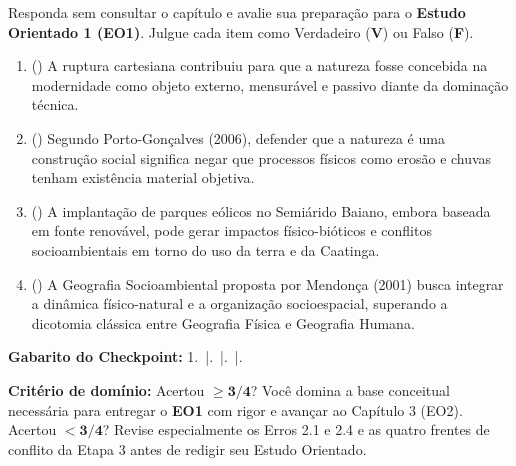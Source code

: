 \begin{boxTeste}
Responda sem consultar o capítulo e avalie sua preparação para o \textbf{Estudo Orientado 1 (EO1)}. Julgue cada item como Verdadeiro (\textbf{V}) ou Falso (\textbf{F}).
\begin{enumerate}[leftmargin=1.8em, itemsep=3pt]
  \item (\quad) A ruptura cartesiana contribuiu para que a natureza fosse concebida na modernidade como objeto externo, mensurável e passivo diante da dominação técnica.
  \item (\quad) Segundo Porto-Gonçalves (2006), defender que a natureza é uma construção social significa negar que processos físicos como erosão e chuvas tenham existência material objetiva.
  \item (\quad) A implantação de parques eólicos no Semiárido Baiano, embora baseada em fonte renovável, pode gerar impactos físico-bióticos e conflitos socioambientais em torno do uso da terra e da Caatinga.
  \item (\quad) A Geografia Socioambiental proposta por Mendonça (2001) busca integrar a dinâmica físico-natural e a organização socioespacial, superando a dicotomia clássica entre Geografia Física e Geografia Humana.
\end{enumerate}

\vspace{4pt}
\textbf{Gabarito do Checkpoint:} 1.~\V \quad|.~\F \quad|.~\V \quad|.~\V

\textbf{Critério de domínio:} Acertou $\mathbf{\ge 3/4}$? Você domina a base conceitual necessária para entregar o \textbf{EO1} com rigor e avançar ao Capítulo 3 (EO2). Acertou $\mathbf{< 3/4}$? Revise especialmente os Erros 2.1 e 2.4 e as quatro frentes de conflito da Etapa 3 antes de redigir seu Estudo Orientado.
\end{boxTeste}

